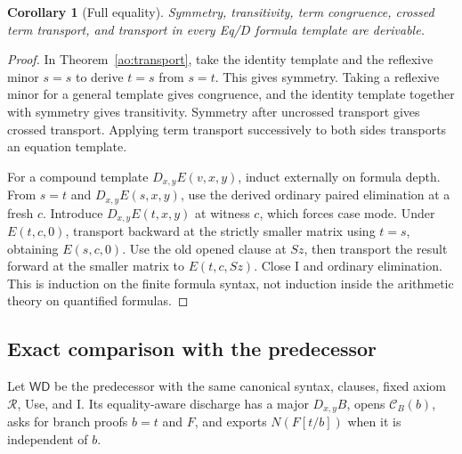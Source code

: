 \documentclass[11pt,letterpaper]{article}
\newtheorem{corollary}[theorem]{Corollary}
\theoremstyle{definition}
\begin{document}
\begin{corollary}[Full equality]
\label{ao:full-equality}
Symmetry, transitivity, term congruence, crossed term transport, and
transport in every Eq/$D$ formula template are derivable.
\end{corollary}
\begin{proof}
In Theorem~\ref{ao:transport}, take the identity template and the
reflexive minor $s=s$ to derive $t=s$ from $s=t$.  This gives symmetry.
Taking a reflexive minor for a general template gives congruence, and
the identity template together with symmetry gives transitivity.
Symmetry after uncrossed transport gives crossed transport.  Applying
term transport successively to both sides transports an equation template.

For a compound template $D_{x,y}E(v,x,y)$, induct externally on formula
depth.  From $s=t$ and $D_{x,y}E(s,x,y)$, use the derived ordinary
paired elimination at a fresh $c$.  Introduce $D_{x,y}E(t,x,y)$ at
witness $c$, which forces case mode.  Under $E(t,c,0)$, transport
backward at the strictly smaller matrix using $t=s$, obtaining
$E(s,c,0)$.  Use the old opened clause at $Sz$, then transport the
result forward at the smaller matrix to $E(t,c,Sz)$.  Close I and
ordinary elimination.  This is induction on the finite formula syntax,
not induction inside the arithmetic theory on quantified formulas.
\end{proof}

\subsection{Exact comparison with the predecessor}

Let $\mathsf{WD}$ be the predecessor with the same canonical syntax,
clauses, fixed axiom $\mathcal R$, Use, and I.  Its equality-aware
discharge has a major $D_{x,y}B$, opens $\mathcal C_B(b)$, asks for
branch proofs $b=t$ and $F$, and exports $N(F[t/b])$ when it is
independent of $b$.
\end{document}
